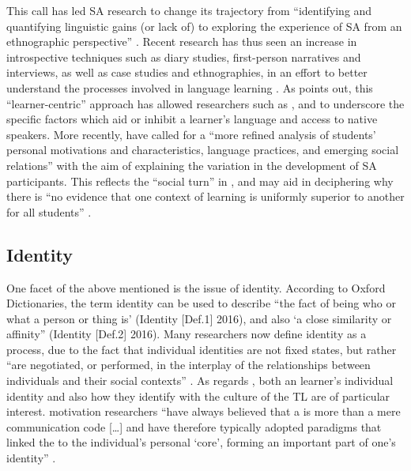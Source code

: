 \documentclass[output=paper]{langsci/langscibook}
\begin{document}
This call has led SA research to change its trajectory from “identifying and quantifying {linguistic} gains (or lack of) to exploring the experience of SA from an ethnographic perspective” \citep[6]{Devlin2014studyabroad}. Recent research has thus seen an increase in introspective techniques such as diary studies, first-person narratives and interviews, as well as case studies and ethnographies, in an effort to better understand the processes involved in language learning \citep{Jackson2008b}. As \citet{Devlin2014studyabroad} points out, this “learner-centric” approach has allowed researchers such as \citet{Isabelli-García2006}, \citet{Jackson2008b} and \citet{Kinginger2004} to underscore the specific factors which aid or inhibit a learner’s language  and access to native speakers. More recently, \citet[134]{MitchellEtAl2015} have called for a “more refined analysis of students’ personal motivations and characteristics,  language practices, and emerging social relations” with the aim of explaining the variation in the  development of  SA participants. This  reflects the “social turn” in  \citep{Block2003}, and may aid in deciphering why there is “no evidence that one context of learning is uniformly superior to another for all students” \cite[164]{CollentineFreed2004intro}. 



\subsection{Identity}


One facet of the above mentioned  is the issue of identity. According to Oxford Dictionaries, the term identity can be used to describe “the fact of being who or what a person or thing is’ (Identity [Def.1] 2016), and also ‘a close similarity or affinity” (Identity [Def.2] 2016). Many researchers now define identity as a process, due to the fact that individual identities are not fixed states, but rather “are negotiated, or performed, in the interplay of the relationships between individuals and their social contexts” \citep[11]{Stockton2015}. As regards , both an  learner’s individual identity and also how they identify with the culture of the TL are of particular interest.  motivation researchers “have always believed that a  is more than a mere communication code […] and have therefore typically adopted paradigms that linked the  to the individual’s personal ‘core’, forming an important part of one’s identity” \citep[9]{DörnyeiUshioda2009}.
\end{document}
